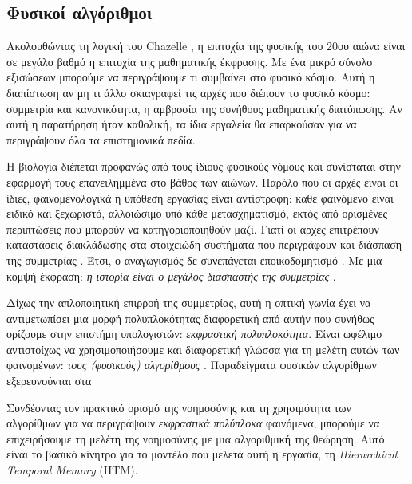 \subsection{Φυσικοί αλγόριθμοι}

  Ακολουθώντας τη λογική του Chazelle \cite{chazelleNaturalAlgorithmsInfluence}, η επιτυχία της φυσικής του 20ου αιώνα είναι σε μεγάλο βαθμό η επιτυχία της μαθηματικής έκφρασης.
  Με ένα μικρό σύνολο εξισώσεων μπορούμε να περιγράψουμε τι συμβαίνει στο φυσικό κόσμο.
  Αυτή η διαπίστωση αν μη τι άλλο σκιαγραφεί τις αρχές που διέπουν το φυσικό κόσμο:
  συμμετρία και κανονικότητα, η αμβροσία της συνήθους μαθηματικής διατύπωσης.
  Αν αυτή η παρατήρηση ήταν καθολική, τα ίδια εργαλεία θα επαρκούσαν για να περιγράψουν όλα τα επιστημονικά πεδία.

  Η βιολογία διέπεται προφανώς από τους ίδιους φυσικούς νόμους και συνίσταται στην εφαρμογή τους επανειλημμένα στο βάθος των αιώνων.
  Παρόλο που οι αρχές είναι οι ίδιες, φαινομενολογικά η υπόθεση εργασίας είναι αντίστροφη:
  καθε φαινόμενο είναι ειδικό και ξεχωριστό, αλλοιώσιμο υπό κάθε μετασχηματισμό, εκτός από ορισμένες περιπτώσεις που μπορούν να κατηγοριοποιηθούν μαζί.
  Γιατί οι αρχές επιτρέπουν καταστάσεις διακλάδωσης στα στοιχειώδη συστήματα που περιγράφουν και διάσπαση της συμμετρίας \parencite{bradingSymmetrySymmetryBreaking2017}.
  Έτσι, ο αναγωγισμός δε συνεπάγεται εποικοδομητισμό \parencite{andersonMoreDifferent1972}.
  Με μια κομψή έκφραση: \textit{η ιστορία είναι ο μεγάλος διασπαστής της συμμετρίας} \parencite{chazelleNaturalAlgorithmsInfluence}.

  Δίχως την απλοποιητική επιρροή της συμμετρίας, αυτή η οπτική γωνία έχει να αντιμετωπίσει μια μορφή πολυπλοκότητας διαφορετική
  από αυτήν που συνήθως ορίζουμε στην επιστήμη υπολογιστών: \textit{εκφραστική πολυπλοκότητα}.
  Είναι ωφέλιμο αντιστοίχως να χρησιμοποιήσουμε και διαφορετική γλώσσα για τη μελέτη
  αυτών των φαινομένων: \textit{τους (φυσικούς) αλγορίθμους} \parencite{chazelleNaturalAlgorithmsInfluence}.
  Παραδείγματα φυσικών αλγορίθμων εξερευνούνται στα \cite{patonComputationCellsTissues2013,adamatzkyAdvancesPhysarumMachines2016}
  \medskip

  Συνδέοντας τον πρακτικό ορισμό της νοημοσύνης και τη χρησιμότητα των αλγορίθμων για να περιγράψουν \textit{εκφραστικά πολύπλοκα} φαινόμενα,
  μπορούμε να επιχειρήσουμε τη μελέτη της νοημοσύνης με μια αλγοριθμική της θεώρηση.
  Αυτό είναι το βασικό κίνητρο για το μοντέλο που μελετά αυτή η εργασία, τη \textit{Hierarchical Temporal Memory} (HTM).

